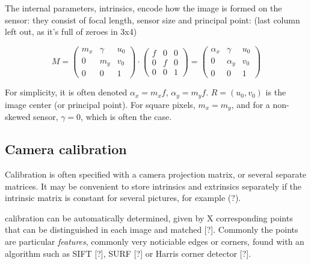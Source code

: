 
The internal parameters, intrinsics, encode how the image is formed on the sensor: they consist of focal length, sensor size and principal point: (last column left out, as it's full of zeroes in 3x4)

\begin{equation}
	M =
	\begin{pmatrix}
		m_x & \gamma & u_0\\
		0   &    m_y & v_0\\
		0   &        0 & 1
	\end{pmatrix}
\cdot
	\begin{pmatrix}
		f & 0 & 0\\
		0 & f & 0\\
		0 & 0 & 1
	\end{pmatrix}
	=
	\begin{pmatrix}
		\alpha_x & \gamma   & u_0\\
		0        & \alpha_y & v_0\\
		0        & 0        & 1
	\end{pmatrix}
\end{equation}

For simplicity, it is often denoted $\alpha_x = m_x f$, $\alpha_y = m_y f$. $R = (u_0, v_0)$ is the image center (or principal point). For square pixels, $m_x = m_y$, and for a non-skewed sensor, $\gamma = 0$, which is often the case. \cite{hartley03multiview,szeliski10vision,heyden2005multiple}



\subsection{Camera calibration} %

Calibration is often specified with a camera projection matrix, or several separate matrices.
It may be convenient to store intrinsics and extrinsics separately if the intrinsic matrix is constant for several pictures, for example (?).

calibration can be automatically determined, given by X corresponding points that can be distinguished in each image and matched [?]. Commonly the points are particular \emph{features}, commonly very noticiable edges or corners, found with an algorithm such as SIFT [?], SURF [?] or Harris corner detector [?]. %

